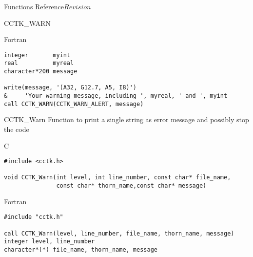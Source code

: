 \begin{cactuspart}{ Functions Reference}{}{$Revision$}
\begin{FunctionDescription}{CCTK\_WARN}
\begin{ExampleSection}
\begin{Example}{Fortran}
\begin{verbatim}
integer       myint
real          myreal
character*200 message

write(message, '(A32, G12.7, A5, I8)')
&     'Your warning message, including ', myreal, ' and ', myint
call CCTK_WARN(CCTK_WARN_ALERT, message)
\end{verbatim}
\end{Example}
\end{ExampleSection}
\end{FunctionDescription}

\begin{FunctionDescription}{CCTK\_Warn}
\label{CCTK-Warn}
Function to print a single string as error message and possibly stop the code

\begin{SynopsisSection}
\begin{Synopsis}{C}
\begin{verbatim}
#include <cctk.h>

void CCTK_Warn(int level, int line_number, const char* file_name,
               const char* thorn_name,const char* message)
\end{verbatim}
\end{Synopsis}
\begin{Synopsis}{Fortran}
\begin{verbatim}
#include "cctk.h"

call CCTK_Warn(level, line_number, file_name, thorn_name, message)
integer level, line_number
character*(*) file_name, thorn_name, message
\end{verbatim}
\end{Synopsis}
\end{SynopsisSection}


\end{FunctionDescription}
\end{cactuspart}
